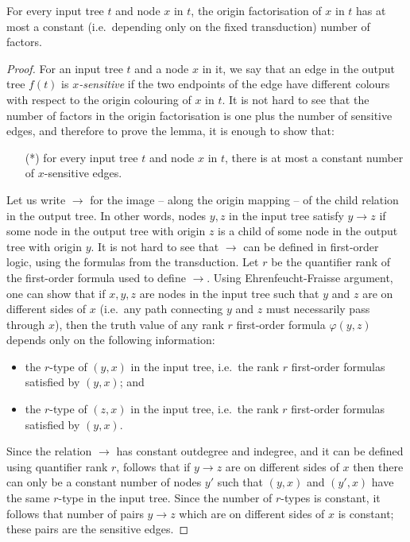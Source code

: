 \begin{lemma}\label{lem:composition-method}
    For every input tree $t$ and node $x$ in $t$, the origin factorisation of $x$ in $t$ has at most a constant (i.e.~depending only on the fixed transduction) number of  factors. 
\end{lemma}
\begin{proof}
    For an input tree $t$ and a node $x$ in it, we say that an edge in the output tree $f(t)$ is \emph{$x$-sensitive} if the two endpoints of the edge have different colours with respect to the origin colouring of $x$ in $t$. It is not hard to see that the number of factors in the origin factorisation is one plus the  number of sensitive edges, and therefore to prove the lemma, it is enough to show that:
    \begin{itemize}
        \item[(*)] for every input tree $t$ and node $x$ in $t$,  there is at most a constant  number of $x$-sensitive edges.
    \end{itemize}
    
    Let us write  $\to$ for the image -- along the origin mapping -- of the  child relation in the output tree. In other words,  nodes $y,z$ in the input tree satisfy $y \to z$ if some node in the output tree with origin $z$ is a child of some node in the output tree with origin $y$.   
     It is not hard to  see that $\to$ can be defined in first-order logic, using the formulas from the transduction. Let $r$ be the quantifier rank of the first-order formula used to define $\to$. Using Ehrenfeucht-Fraisse argument, one can show that  if $x,y,z$ are nodes in the input tree such that $y$ and $z$ are on different sides of $x$ (i.e.~any path connecting $y$ and $z$ must necessarily pass through $x$),
    then the truth value of any rank $r$ first-order formula $\varphi(y,z)$   depends only on the following information:
    \begin{itemize}
        \item the $r$-type of  $(y,x)$ in the input tree, i.e.~the rank $r$ first-order formulas satisfied by $(y,x)$; and
         \item the $r$-type of  $(z,x)$ in the input tree, i.e.~the rank $r$ first-order formulas satisfied by $(y,x)$.
        \end{itemize}
    Since the relation $\to$ has constant outdegree and indegree, and it can be defined using quantifier rank $r$,  follows that if $y\to z$ are on different sides of $x$ then there can only be a constant number of nodes $y'$ such that $(y,x)$ and $(y',x)$ have the same $r$-type in the input tree. Since the number of $r$-types is constant, it follows that number of pairs $y \to z$ which are on different sides of $x$ is constant; these pairs are the sensitive edges. 
\end{proof}

